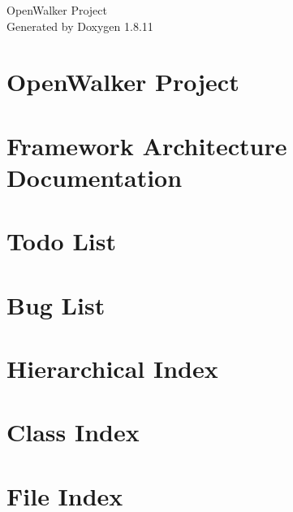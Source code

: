 \documentclass[twoside]{book}
\newcommand{\+}{\discretionary{\mbox{\scriptsize$\hookleftarrow$}}{}{}}
\newcommand{\clearemptydoublepage}{%
  \newpage{\pagestyle{empty}\cleardoublepage}%
}
\begin{document}
\hypersetup{pageanchor=false,
             bookmarksnumbered=true,
             pdfencoding=unicode
            }
\begin{titlepage}
\vspace*{7cm}
\begin{center}%
{\Large Open\+Walker Project }\\
\vspace*{1cm}
{\large Generated by Doxygen 1.8.11}\\
\end{center}
\end{titlepage}
\clearemptydoublepage
\tableofcontents
\clearemptydoublepage
{}
\hypersetup{pageanchor=true}

\chapter{Open\+Walker Project}
\label{index}\hypertarget{index}{}
\chapter{Framework Architecture Documentation}
\label{FrameworkArchitecturePage}
\hypertarget{FrameworkArchitecturePage}{}

\chapter{Todo List}
\label{todo}
\hypertarget{todo}{}

\chapter{Bug List}
\label{bug}
\hypertarget{bug}{}

\chapter{Hierarchical Index}

\chapter{Class Index}

\chapter{File Index}

\end{document}
